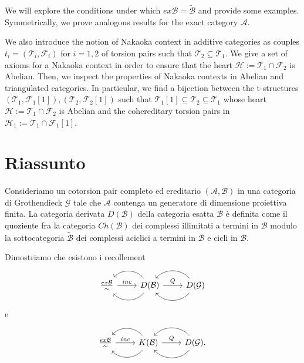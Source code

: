 We will explore the conditions under which $ex\mathcal{B}=\widetilde{\mathcal{B}}$ and provide some examples. Symmetrically, we prove analogous results for the exact category $\mathcal{A}$.

We also introduce the notion of Nakaoka context in additive categories as couples $t_i=(\mathcal{T}_i,\mathcal{F}_i)$ for $i=1,2$ of torsion pairs such that $\mathcal{T}_2\subseteq \mathcal{T}_1$. We give a set of axioms for a Nakaoka context in order to ensure that the heart $\mathcal{H}:=\mathcal{T}_1\cap \mathcal{F}_2$ is Abelian. Then, we inspect the properties of Nakaoka contexts in Abelian and triangulated categories. In particular, we find a bijection between the t-structures $(\mathcal{T}_1,\mathcal{F}_1[1]), (\mathcal{T}_2,\mathcal{F}_2[1])$ such that $\mathcal{T}_1[1]\subseteq\mathcal{T}_2\subseteq\mathcal{T}_1$ whose heart $\mathcal{H}:=\mathcal{T}_1\cap\mathcal{F}_2$ is Abelian and the cohereditary torsion pairs in $\mathcal{H}_1:=\mathcal{T}_1\cap\mathcal{F}_1[1]$.

\endgroup

\cleardoublepage
{}
\begingroup
\let\clearpage\relax
\let\cleardoublepage\relax
\let\cleardoublepage\relax


\chapter*{Riassunto}

Consideriamo un cotorsion pair completo ed ereditario $(\mathcal{A},\mathcal{B})$ in una categoria di Grothendieck $\mathcal{G}$ tale che $\mathcal{A}$ contenga un generatore di dimensione proiettiva finita. La categoria derivata $D(\mathcal{B})$ della categoria esatta $\mathcal{B}$ \`e definita come il quoziente fra la categoria $Ch(\mathcal{B})$ dei complessi illimitati a termini in $\mathcal{B}$ modulo la sottocategoria $\widetilde{\mathcal{B}}$ dei complessi aciclici a termini in $\mathcal{B}$ e cicli in $\mathcal{B}$.

Dimostriamo che esistono i recollement
\begin{equation*}
  \begin{tikzcd}
    \frac{ex\mathcal{B}}{\sim}\arrow{r}{inc}
    & D(\mathcal{B})\arrow[bend left=50]{l}\arrow[bend right=50]{l}\arrow{r}{Q}
    & D(\mathcal{G})\arrow[bend left=50]{l}\arrow[bend right=50]{l}
  \end{tikzcd}
\end{equation*}
e
\begin{equation*}
  \begin{tikzcd}
    \frac{ex\mathcal{B}}{\sim}\arrow{r}{inc}
    & K(\mathcal{B})\arrow[bend left=50]{l}\arrow[bend right=50]{l}\arrow{r}{Q}
    & D(\mathcal{G}).\arrow[bend left=50]{l}\arrow[bend right=50]{l}
  \end{tikzcd}
\end{equation*}

